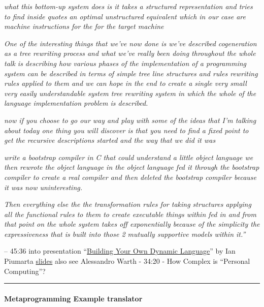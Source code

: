 \emph{what this bottom-up system does is it takes a structured
representation and tries to find inside quotes an optimal unstructured
equivalent which in our case are machine instructions for the for the
target machine}

\emph{One of the interesting things that we've now done is we've
described cogeneration as a tree rewriting process and what we've really
been doing throughout the whole talk is describing how various phases of
the implementation of a programming system can be described in terms of
simple tree line structures and rules rewriting rules applied to them
and we can hope in the end to create a single very small very easily
understandable system tree rewriting system in which the whole of the
language implementation problem is described.}

\emph{now if you choose to go our way and play with some of the ideas
that I'm talking about today one thing you will discover is that you
need to find a fixed point to get the recursive descriptions started and
the way that we did it was}

\emph{write a bootstrap compiler in C that could understand a little
object language we then rewrote the object language in the object
language fed it through the bootstrap compiler to create a real compiler
and then deleted the bootstrap compiler because it was now
uninteresting.}

\emph{Then everything else the the transformation rules for taking
structures applying all the functional rules to them to create
executable things within fed in and from that point on the whole system
takes off exponentially because of the simplicity the expressiveness
that is built into those 2 mutually supportive models within it.''}

-- 45:36 into presentation
``\href{https://youtu.be/cn7kTPbW6QQ}{Building Your Own Dynamic
Language}'' by Ian Piumarta
\href{https://www.piumarta.com/papers/EE380-2007-slides.pdf}{slides}
also see Alessandro Warth - 34:20 - How Complex is ``Personal
Computing''?

\begin{center}\rule{0.5\linewidth}{0.5pt}\end{center}

\hypertarget{metaprogramming-example-translator}{%
\paragraph{Metaprogramming Example
translator}\label{metaprogramming-example-translator}}

